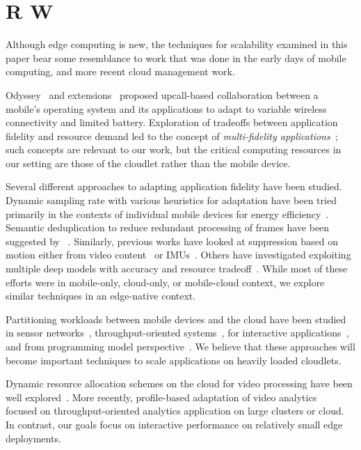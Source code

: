 \section{R W}
\label{sec:related}

Although edge computing is new, the techniques for scalability
examined in this paper bear some resemblance to work that was done in
the early days of mobile computing, and more recent cloud management
work.

Odyssey~\cite{Noble1997} and extensions~\cite{Flinn1999} proposed
upcall-based collaboration between a mobile's operating system and its
applications to adapt to variable wireless connectivity and limited
battery. 
Exploration of tradeoffs between application fidelity and
resource demand led to the concept of {\em multi-fidelity
  applications}~\cite{Satya1999}; such concepts are relevant to our
work, but the critical computing resources in our setting are those of
the cloudlet rather than the mobile device.

Several different approaches to adapting application fidelity have
been studied.  Dynamic sampling rate with various heuristics for
adaptation have been tried primarily in the contexts of individual
mobile devices for energy efficiency~\cite{lorincz2009mercury,
  lorincz2008resource, vallina2012energy, lane2010survey}. Semantic
deduplication to reduce redundant processing of frames have been
suggested by ~\cite{Hu2015, kang2017noscope, hsieh2018focus,
  zhang2015design}. Similarly, previous works have looked at
suppression based on motion either from video
content~\cite{naderiparizi2017glimpse, lebeckcollaborative} or
IMUs~\cite{jain2015overlay}. Others have investigated exploiting
multiple deep models with accuracy and resource
tradeoff~\cite{han2016mcdnn,jiang2018chameleon}. While most of these
efforts were in mobile-only, cloud-only, or mobile-cloud context, we
explore similar techniques in an edge-native context.


Partitioning workloads between mobile devices and the cloud have been
studied in sensor networks~\cite{newton2009wishbone},
throughput-oriented systems~\cite{cuervo2010maui, yi2017lavea}, for
interactive applications~\cite{ra2011odessa, chen2015glimpse}, and
from programming model perspective~\cite{balan2003tactics}. We believe
that these approaches will become important techniques to scale
applications on heavily loaded cloudlets.

Dynamic resource allocation schemes on the cloud for video processing
have been well explored~\cite{sembiring2013dynamic, fu2015drs,
  kaseb2015cloud}.  More recently, profile-based adaptation of video
analytics~\cite{zhang2017live, hung2018videoedge, jiang2018chameleon}
focused on throughput-oriented analytics application on large clusters
or cloud. In contrast, our goals focus on interactive performance on
relatively small edge deployments.


